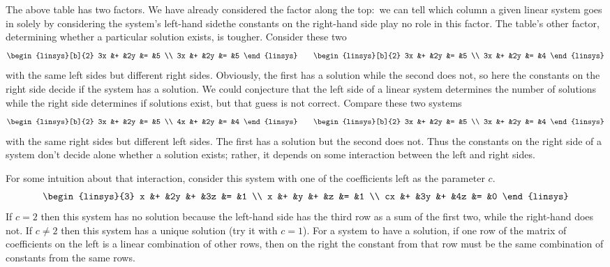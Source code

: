 The above table has two factors.
We have already considered the factor along the top:~we can tell
which column a given linear system goes in
solely by considering the system's left-hand side\Dash the 
constants on the right-hand side play no role in this factor.
The table's other factor, 
determining whether a particular solution exists, is tougher.
Consider these two
\begin{equation*}
  \begin{linsys}[b]{2}
    3x &+ &2y &= &5  \\
    3x &+ &2y &= &5
  \end{linsys}
  \qquad
  \begin{linsys}[b]{2}
    3x &+ &2y &= &5  \\
    3x &+ &2y &= &4
  \end{linsys}
\end{equation*}
with the same left sides but different right sides.
Obviously, the first has a solution while the second does not, so
here the constants on the right side decide if the system has a solution.
We could conjecture that the left side of a linear system determines
the number of solutions while the right side determines if solutions
exist, but that guess is not correct.
Compare these two systems
\begin{equation*}
  \begin{linsys}[b]{2}
    3x &+ &2y &= &5  \\
    4x &+ &2y &= &4
  \end{linsys}
  \qquad
  \begin{linsys}[b]{2}
    3x &+ &2y &= &5  \\
    3x &+ &2y &= &4
  \end{linsys}
\end{equation*}
with the same right sides but different left sides.
The first has a solution but the second does not.
Thus the constants on the right side of a system 
don't decide alone whether a solution exists;
rather, it depends on some interaction between the left and
right sides.

For some intuition about that interaction,
consider this system with one of the coefficients left as the 
parameter $c$.
\begin{equation*}
  \begin{linsys}{3}
    x  &+  &2y  &+  &3z  &=  &1  \\
    x  &+  &y   &+  &z   &=  &1  \\
   cx  &+  &3y  &+  &4z  &=  &0
  \end{linsys}
\end{equation*}
If \( c=2 \) then this system has no solution because the left-hand side 
has the third row as a sum of the first two, while the right-hand does not.
If \( c\neq 2 \) then this system has a unique solution (try it with \( c=1 \)).
For a system to have a solution, if one row of the matrix of coefficients on
the left is a linear combination of other rows,
then on the right the constant from that row must be the same
combination of constants from the same rows.

